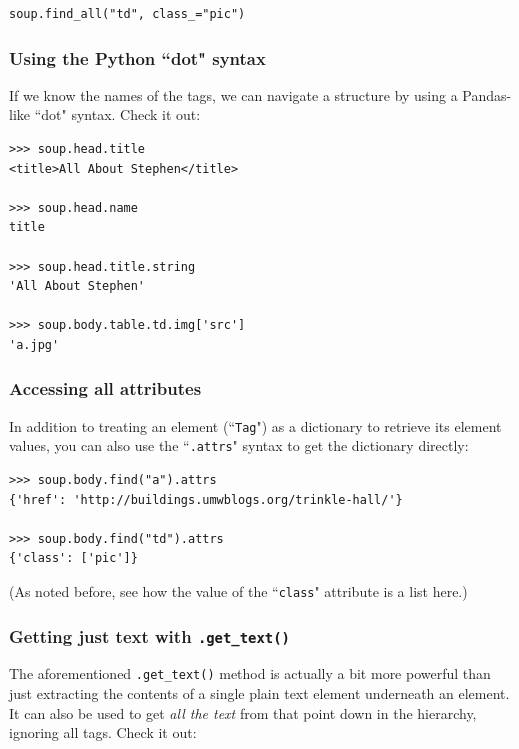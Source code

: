 \documentclass[12pt]{article}
\begin{document}
\begin{Verbatim}[fontsize=\small,samepage=true,frame=none]
soup.find_all("td", class_="pic")
\end{Verbatim}

\subsubsection{Using the Python ``dot" syntax}

If we know the names of the tags, we can navigate a structure by using a
Pandas-like ``dot" syntax. Check it out:

\begin{Verbatim}[fontsize=\small,samepage=true,frame=none]
>>> soup.head.title
<title>All About Stephen</title>

>>> soup.head.name
title

>>> soup.head.title.string
'All About Stephen'

>>> soup.body.table.td.img['src']
'a.jpg'
\end{Verbatim}

\subsubsection{Accessing all attributes}

In addition to treating an element (``\texttt{Tag}") as a dictionary to
retrieve its element values, you can also use the ``\texttt{.attrs}" syntax to
get the dictionary directly:

\begin{Verbatim}[fontsize=\small,samepage=true,frame=none]
>>> soup.body.find("a").attrs
{'href': 'http://buildings.umwblogs.org/trinkle-hall/'}

>>> soup.body.find("td").attrs
{'class': ['pic']}
\end{Verbatim}

(As noted before, see how the value of the ``\texttt{class}" attribute is a
list here.)

\subsubsection{Getting just text with \texttt{.get\_text()}}

The aforementioned \texttt{.get\_text()} method is actually a bit more
powerful than just extracting the contents of a single plain text element
underneath an element. It can also be used to get \textit{all the text} from
that point down in the hierarchy, ignoring all tags. Check it out:
\end{document}

